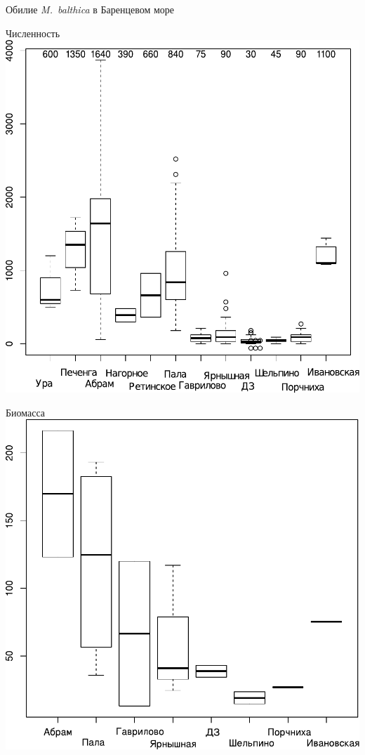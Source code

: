 \documentclass{beamer}
\begin{document}
\begin{frame}{Обилие {\it M.~balthica} в Баренцевом море}
	\begin{minipage}[t]{.49\linewidth}
		\begin{center}
		{\footnotesize Численность}
			\includegraphics[width=\textwidth]{N2_area_Barents1.pdf}
		\end{center}
	\end{minipage}
%
	\begin{minipage}[t]{.49\linewidth}
		\begin{center}
		{\footnotesize Биомасса}
			\includegraphics[width=\textwidth]{B_Barents_uchastki_ru1.pdf}
		\end{center}
	\end{minipage}


\end{frame}
\end{document}
